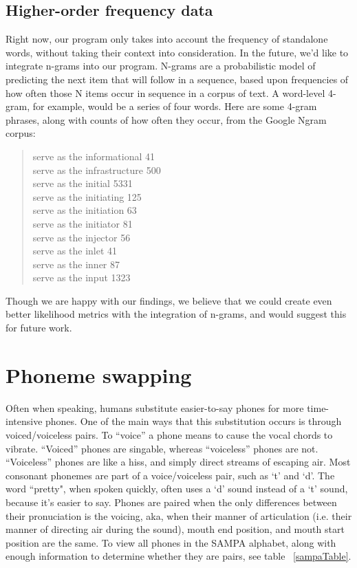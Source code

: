 \subsection{Higher-order frequency data}
\label{subsection:HigherOrderFrequencyData}

Right now, our program only takes into account the frequency of standalone words, without taking their context into consideration.  In the future, we'd like to integrate n-grams into our program. N-grams are a probabilistic model of predicting the next item that will follow in a sequence, based upon frequencies of how often those N items occur in sequence in a corpus of text\cite{ngramSiteFreeLists}.  A word-level 4-gram, for example, would be a series of four words. Here are some 4-gram phrases, along with counts of how often they occur, from the Google Ngram corpus:
\begin{quote}
serve as the informational 41 \\
serve as the infrastructure 500 \\
serve as the initial 5331\\
serve as the initiating 125\\
serve as the initiation 63\\
serve as the initiator 81\\
serve as the injector 56\\
serve as the inlet 41\\
serve as the inner 87\\
serve as the input 1323\\
\end{quote} \cite{allOurNgramsAreBelongToYou}




Though we are happy with our findings, we believe that we could create even better likelihood metrics with the integration of n-grams, and would suggest this for future work. 


\section{Phoneme swapping}
\label{section:phonemeSwapping}

Often when speaking, humans substitute easier-to-say phones for more time-intensive phones.  One of the main ways that this substitution occurs is through voiced/voiceless pairs.  To “voice” a phone means to cause the vocal chords to vibrate.  “Voiced” phones are singable, whereas “voiceless” phones are not.  “Voiceless” phones are like a hiss, and simply direct streams of escaping air.  Most consonant phonemes are part of a voice/voiceless pair, such as `t' and `d'.  The word ``pretty", when spoken quickly, often uses a `d' sound instead of a `t' sound, because it's easier to say. Phones are paired when the only differences between their pronuciation is the voicing, aka, when their manner of articulation (i.e. their manner of directing air during the sound), mouth end position, and mouth start position are the same.  To view all phones in the SAMPA alphabet, along with enough information to determine whether they are pairs, see table ~\ref{sampaTable}.


